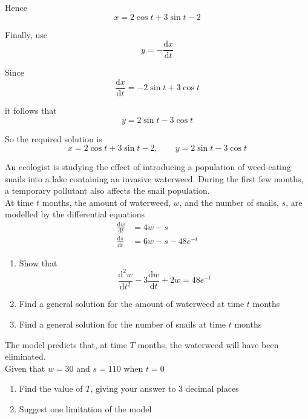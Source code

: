 \documentclass[leqno]{article}
\begin{document}
\begin{enumerate}[
  label=\textbf{\arabic*.},
  leftmargin=*,
  topsep=0pt,
  partopsep=0pt,
  parsep=0pt
]
\begin{djsSolution}
  Hence
  \[
  x=2\cos t+3\sin t-2
  \]
  
  Finally, use
  \[
  y=-\frac{\mathrm{d}x}{\mathrm{d}t}
  \]
  
  Since
  \[
  \frac{\mathrm{d}x}{\mathrm{d}t}=-2\sin t+3\cos t
  \]

  it follows that
  \[
  y=2\sin t-3\cos t
  \]
  
  So the required solution is
  \[
  x=2\cos t+3\sin t-2, \qquad y=2\sin t-3\cos t
  \]
  \end{djsSolution}


\newpage

\questionitem

An ecologist is studying the effect of introducing a population of weed-eating snails into a lake containing an invasive waterweed. During the first few months, a temporary pollutant also affects the snail population. \\

At time $t$ months, the amount of waterweed, $w$, and the number of snails, $s$, are modelled by the differential equations \\
\begin{align*}
\frac{\mathrm{d}w}{\mathrm{d}t}&=4w-s \\[5pt]
\frac{\mathrm{d}s}{\mathrm{d}t}&=6w-s-48e^{-t}
\end{align*}

\begin{enumerate}[label=\textbf{(\alph*)}]
  \item Show that
  \[\frac{\mathrm{d}^2 w}{\mathrm{d}t^2}-3\frac{\mathrm{d}w}{\mathrm{d}t}+2w=48e^{-t}\]
  \item Find a general solution for the amount of waterweed at time $t$ months  \\
  \item Find a general solution for the number of snails at time $t$ months  \\
\end{enumerate}
The model predicts that, at time $T$ months, the waterweed will have been eliminated. \\
Given that $w=30$ and $s=110$ when $t=0$ \\
\begin{enumerate}[label=\textbf{(\alph*)}, resume]
  \item Find the value of $T$, giving your answer to 3 decimal places  \\
  \item Suggest one limitation of the model  \\
\end{enumerate}


\end{enumerate}
\end{document}
